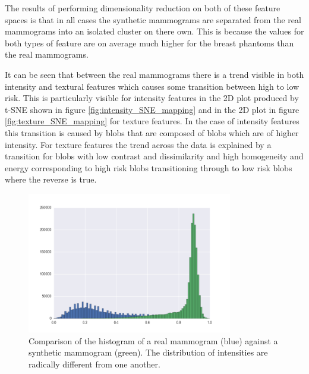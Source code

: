 The results of performing dimensionality reduction on both of these feature spaces is that in all cases the synthetic mammograms are separated from the real mammograms into an isolated cluster on there own. This is because the values for both types of feature are on average much higher for the breast phantoms than the real mammograms.

It can be seen that between the real mammograms there is a trend visible in both intensity and textural features which causes some transition between high to low risk. This is particularly visible for intensity features in the 2D plot produced by t-SNE shown in figure \ref{fig:intensity_SNE_mapping} and in the 2D plot in figure \ref{fig:texture_SNE_mapping} for texture features. In the case of intensity features this transition is caused by blobs that are composed of blobs which are of higher intensity. For texture features the trend across the data is explained by a transition for blobs with low contrast and dissimilarity and high homogeneity and energy corresponding to high risk blobs transitioning through to low risk blobs where the reverse is true.

\begin{figure}
	\label{fig:mammogram-histogram}
	\centering
	\includegraphics[width=0.8\textwidth]{Images/inverted_hist.png}	
	\caption{Comparison of the histogram of a real mammogram (blue) against a synthetic mammogram (green). The distribution of intensities are radically different from one another.}
\end{figure}

